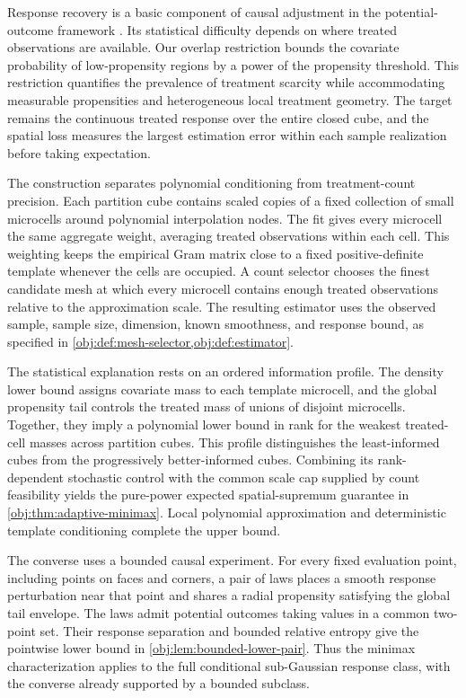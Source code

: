 Response recovery is a basic component of causal adjustment in the potential-outcome framework \citep{rubin1974,rosenbaum1983,imbens2015}. Its statistical difficulty depends on where treated observations are available. Our overlap restriction bounds the covariate probability of low-propensity regions by a power of the propensity threshold. This restriction quantifies the prevalence of treatment scarcity while accommodating measurable propensities and heterogeneous local treatment geometry. The target remains the continuous treated response over the entire closed cube, and the spatial loss measures the largest estimation error within each sample realization before taking expectation.

The construction separates polynomial conditioning from treatment-count precision. Each partition cube contains scaled copies of a fixed collection of small microcells around polynomial interpolation nodes. The fit gives every microcell the same aggregate weight, averaging treated observations within each cell. This weighting keeps the empirical Gram matrix close to a fixed positive-definite template whenever the cells are occupied. A count selector chooses the finest candidate mesh at which every microcell contains enough treated observations relative to the approximation scale. The resulting estimator uses the observed sample, sample size, dimension, known smoothness, and response bound, as specified in \cref{obj:def:mesh-selector,obj:def:estimator}.

The statistical explanation rests on an ordered information profile. The density lower bound assigns covariate mass to each template microcell, and the global propensity tail controls the treated mass of unions of disjoint microcells. Together, they imply a polynomial lower bound in rank for the weakest treated-cell masses across partition cubes. This profile distinguishes the least-informed cubes from the progressively better-informed cubes. Combining its rank-dependent stochastic control with the common scale cap supplied by count feasibility yields the pure-power expected spatial-supremum guarantee in \cref{obj:thm:adaptive-minimax}. Local polynomial approximation and deterministic template conditioning complete the upper bound.

The converse uses a bounded causal experiment. For every fixed evaluation point, including points on faces and corners, a pair of laws places a smooth response perturbation near that point and shares a radial propensity satisfying the global tail envelope. The laws admit potential outcomes taking values in a common two-point set. Their response separation and bounded relative entropy give the pointwise lower bound in \cref{obj:lem:bounded-lower-pair}. Thus the minimax characterization applies to the full conditional sub-Gaussian response class, with the converse already supported by a bounded subclass.

